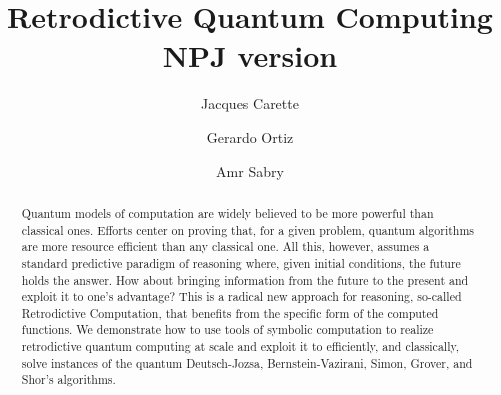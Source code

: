 \documentclass[aps,prl,twocolumn,superscriptaddress,floatfix,notitlepage]{revtex4-2}
\begin{document}
\title{Retrodictive Quantum Computing \\ NPJ version}

\begin{abstract}
Quantum models of computation are widely believed to be more powerful
than classical ones. Efforts center on proving that, for a given
problem, quantum algorithms are more resource efficient than any
classical one. All this, however, assumes a standard predictive
paradigm of reasoning where, given initial conditions, the future
holds the answer. How about bringing information from the future to
the present and exploit it to one's advantage? This is a radical new
approach for reasoning, so-called Retrodictive Computation, that
benefits from the specific form of the computed functions. We
demonstrate how to use tools of symbolic computation to realize
retrodictive quantum computing at scale and exploit it to efficiently,
and classically, solve instances of the quantum Deutsch-Jozsa,
Bernstein-Vazirani, Simon, Grover, and Shor's algorithms.
\end{abstract}

\author{Jacques Carette }
\author{Gerardo Ortiz }
\author{Amr Sabry }

\maketitle
\end{document}

